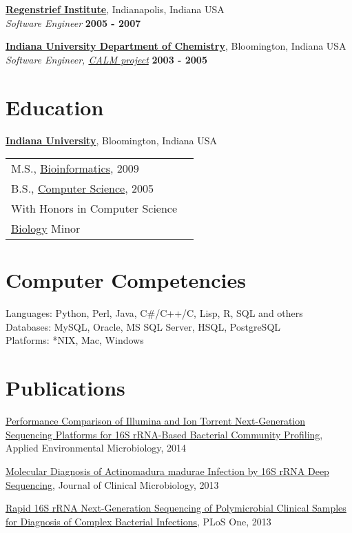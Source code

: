 \documentclass{res}
\begin{document}
\begin{resume}
\href{http://www.regenstrief.org/}{\textbf{Regenstrief Institute}},
Indianapolis, Indiana USA\\
\textit{Software Engineer} \hfill \textbf{2005 - 2007}

\href{http://chem.indiana.edu/}{\textbf{Indiana University Department of Chemistry}}, Bloomington, Indiana USA\\
\textit{Software Engineer, \href{http://calm.indiana.edu/}{CALM project}} \hfill \textbf{2003 - 2005}

\section{Education}
\href{http://www.iub.edu/}{\textbf{Indiana University}}, Bloomington, Indiana USA\\
\begin{tabular}{p{10cm} l} 
M.S., \href{http://xavier.informatics.indiana.edu/gradsites/bio/masters/}{Bioinformatics}, 2009\\
B.S., \href{http://www.cs.indiana.edu/}{Computer Science}, 2005\\
With Honors in Computer Science\\
\href{http://www.bio.indiana.edu/}{Biology} Minor
\end{tabular}

\section{Computer Competencies} 
Languages: Python, Perl, Java, C\#/C++/C, Lisp, R, SQL and others\\
Databases: MySQL, Oracle, MS SQL Server, HSQL, PostgreSQL\\
Platforms: *NIX, Mac, Windows

\section{Publications}
\renewcommand{\section}[2]{}
\begin{thebibliography}{4}
    \href{http://aem.asm.org/content/80/24/7583}
         {Performance Comparison of Illumina and Ion 
          Torrent Next-Generation Sequencing Platforms 
          for 16S rRNA-Based Bacterial Community Profiling},
          Applied Environmental Microbiology, 2014

    \href{http://jcm.asm.org/content/51/12/4262}
         {Molecular Diagnosis of Actinomadura madurae 
          Infection by 16S rRNA Deep Sequencing},
          Journal of Clinical Microbiology, 2013

    \href{http://journals.plos.org/plosone/article?id=10.1371/journal.pone.0065226}
         {Rapid 16S rRNA Next-Generation Sequencing of Polymicrobial 
          Clinical Samples for Diagnosis of Complex Bacterial Infections},
          PLoS One, 2013
\end{thebibliography}
\nocite{*}

\end{resume}
\end{document}
